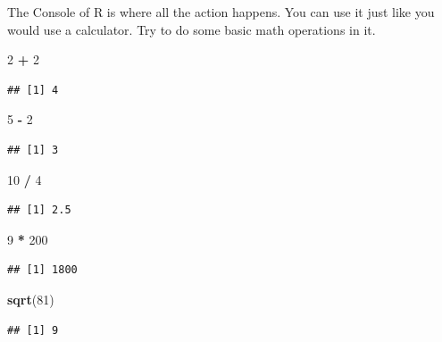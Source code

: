 \documentclass[]{book}
\newenvironment{Shaded}{\begin{snugshade}}{\end{snugshade}}
\newcommand{\KeywordTok}[1]{\textcolor[rgb]{0.13,0.29,0.53}{\textbf{#1}}}
\newcommand{\DecValTok}[1]{\textcolor[rgb]{0.00,0.00,0.81}{#1}}
\newcommand{\StringTok}[1]{\textcolor[rgb]{0.31,0.60,0.02}{#1}}
\newcommand{\OperatorTok}[1]{\textcolor[rgb]{0.81,0.36,0.00}{\textbf{#1}}}
\newcommand{\NormalTok}[1]{#1}
\theoremstyle{definition}
\theoremstyle{definition}
\theoremstyle{definition}
\theoremstyle{remark}
\begin{document}
The Console of R is where all the action happens. You can use it just
like you would use a calculator. Try to do some basic math operations in
it.

\begin{Shaded}
\begin{Highlighting}[]
\DecValTok{2} \OperatorTok{+}\StringTok{ }\DecValTok{2}
\end{Highlighting}
\end{Shaded}

\begin{verbatim}
## [1] 4
\end{verbatim}

\begin{Shaded}
\begin{Highlighting}[]
\DecValTok{5} \OperatorTok{-}\StringTok{ }\DecValTok{2}
\end{Highlighting}
\end{Shaded}

\begin{verbatim}
## [1] 3
\end{verbatim}

\begin{Shaded}
\begin{Highlighting}[]
\DecValTok{10} \OperatorTok{/}\StringTok{ }\DecValTok{4}
\end{Highlighting}
\end{Shaded}

\begin{verbatim}
## [1] 2.5
\end{verbatim}

\begin{Shaded}
\begin{Highlighting}[]
\DecValTok{9} \OperatorTok{*}\StringTok{ }\DecValTok{200}
\end{Highlighting}
\end{Shaded}

\begin{verbatim}
## [1] 1800
\end{verbatim}

\begin{Shaded}
\begin{Highlighting}[]
\KeywordTok{sqrt}\NormalTok{(}\DecValTok{81}\NormalTok{)}
\end{Highlighting}
\end{Shaded}

\begin{verbatim}
## [1] 9
\end{verbatim}
\end{document}
